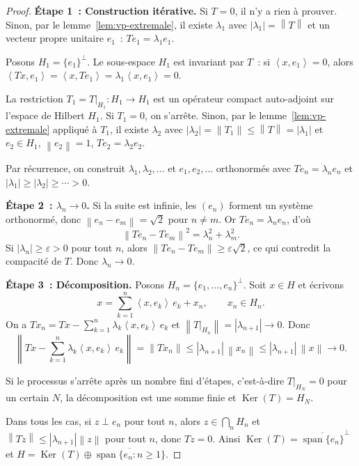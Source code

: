 \documentclass[a4paper,12pt]{book}
\DeclareMathOperator{\Ker}{Ker}
\DeclareMathOperator{\spn}{span}
\newcommand{\norm}[1]{\left\| #1 \right\|}
\newcommand{\abs}[1]{\left| #1 \right|}
\newcommand{\inner}[2]{\left\langle #1, #2 \right\rangle}
\theoremstyle{definition}
\theoremstyle{plain}
\theoremstyle{remark}
\begin{document}
\begin{proof}
\textbf{Étape 1~: Construction itérative.} Si $T = 0$, il n'y a rien à prouver.
Sinon, par le lemme~\ref{lem:vp-extremale}, il existe $\lambda_1$ avec
$\abs{\lambda_1} = \norm{T}$ et un vecteur propre unitaire $e_1$~: $Te_1 = \lambda_1 e_1$.

Posons $H_1 = \{e_1\}^\perp$. Le sous-espace $H_1$ est invariant par $T$~: si
$\inner{x}{e_1} = 0$, alors
$\inner{Tx}{e_1} = \inner{x}{Te_1} = \lambda_1\inner{x}{e_1} = 0$.

La restriction $T_1 = T|_{H_1} : H_1 \to H_1$ est un opérateur compact auto-adjoint sur
l'espace de Hilbert $H_1$. Si $T_1 = 0$, on s'arrête. Sinon, par le
lemme~\ref{lem:vp-extremale} appliqué à $T_1$, il existe $\lambda_2$ avec
$\abs{\lambda_2} = \norm{T_1} \le \norm{T} = \abs{\lambda_1}$ et $e_2 \in H_1$,
$\norm{e_2} = 1$, $Te_2 = \lambda_2 e_2$.

Par récurrence, on construit $\lambda_1, \lambda_2, \ldots$ et $e_1, e_2, \ldots$
orthonormés avec $Te_n = \lambda_n e_n$ et
$\abs{\lambda_1} \ge \abs{\lambda_2} \ge \cdots > 0$.

\textbf{Étape 2~: $\lambda_n \to 0$.} Si la suite est infinie, les $(e_n)$ forment un
système orthonormé, donc $\norm{e_n - e_m} = \sqrt{2}$ pour $n \neq m$. Or
$Te_n = \lambda_n e_n$, d'où
\[
  \norm{Te_n - Te_m}^2 = \lambda_n^2 + \lambda_m^2.
\]
Si $\abs{\lambda_n} \ge \varepsilon > 0$ pour tout $n$, alors
$\norm{Te_n - Te_m} \ge \varepsilon\sqrt{2}$, ce qui contredit la compacité de $T$.
Donc $\lambda_n \to 0$.

\textbf{Étape 3~: Décomposition.} Posons $H_n = \{e_1, \ldots, e_n\}^\perp$. Soit
$x \in H$ et écrivons
\[
  x = \sum_{k=1}^n \inner{x}{e_k}\,e_k + x_n, \qquad x_n \in H_n.
\]
On a $Tx_n = Tx - \sum_{k=1}^n \lambda_k \inner{x}{e_k}\,e_k$ et
$\norm{T|_{H_n}} = \abs{\lambda_{n+1}} \to 0$. Donc
\[
  \norm{Tx - \sum_{k=1}^n \lambda_k \inner{x}{e_k}\,e_k}
    = \norm{Tx_n} \le \abs{\lambda_{n+1}}\,\norm{x_n} \le \abs{\lambda_{n+1}}\,\norm{x}
    \to 0.
\]

Si le processus s'arrête après un nombre fini d'étapes, c'est-à-dire $T|_{H_N} = 0$
pour un certain $N$, la décomposition est une somme finie et $\Ker(T) = H_N$.

Dans tous les cas, si $z \perp e_n$ pour tout $n$, alors $z \in \bigcap_n H_n$ et
$\norm{Tz} \le \abs{\lambda_{n+1}}\norm{z}$ pour tout $n$, donc $Tz = 0$. Ainsi
$\Ker(T) = \overline{\spn\{e_n\}}^\perp$ et
$H = \Ker(T) \oplus \overline{\spn\{e_n : n \ge 1\}}$.
\end{proof}
\end{document}
